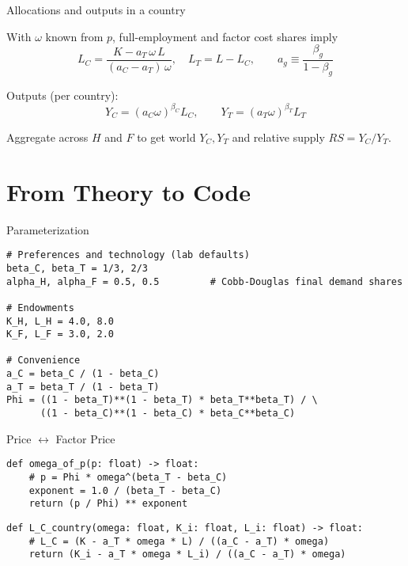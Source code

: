 \documentclass[notes,11pt,aspectratio=169,xcolor=table]{beamer}
\newenvironment{wideitemize}{\itemize\addtolength{\itemsep}{10pt}}{\enditemize}
\begin{document}
\begin{frame}{Allocations and outputs in a country}
\begin{wideitemize}
  \item With \(\omega\) known from \(p\), full-employment and factor cost shares imply
  \[
  L_C = \frac{K - a_T\,\omega\,L}{(a_C-a_T)\,\omega},\quad L_T=L-L_C,\qquad 
  a_g\equiv \frac{\beta_g}{1-\beta_g}
  \]
  \item Outputs (per country):
  \[
   Y_C=(a_C\omega)^{\beta_C} L_C, \qquad Y_T=(a_T\omega)^{\beta_T} L_T
  \]
  \item Aggregate across \(H\) and \(F\) to get world \(Y_C,Y_T\) and relative supply \(RS=Y_C/Y_T\).
\end{wideitemize}
\end{frame}

\section{From Theory to Code}

\begin{frame}[fragile=singleslide]{Parameterization}
\begin{verbatim}
# Preferences and technology (lab defaults)
beta_C, beta_T = 1/3, 2/3
alpha_H, alpha_F = 0.5, 0.5         # Cobb-Douglas final demand shares

# Endowments
K_H, L_H = 4.0, 8.0
K_F, L_F = 3.0, 2.0

# Convenience
a_C = beta_C / (1 - beta_C)
a_T = beta_T / (1 - beta_T)
Phi = ((1 - beta_T)**(1 - beta_T) * beta_T**beta_T) / \
      ((1 - beta_C)**(1 - beta_C) * beta_C**beta_C)
\end{verbatim}
\end{frame}

\begin{frame}[fragile=singleslide]{Price $\leftrightarrow$ Factor Price}
\begin{verbatim}
def omega_of_p(p: float) -> float:
    # p = Phi * omega^(beta_T - beta_C)
    exponent = 1.0 / (beta_T - beta_C)
    return (p / Phi) ** exponent
\end{verbatim}

\begin{verbatim}
def L_C_country(omega: float, K_i: float, L_i: float) -> float:
    # L_C = (K - a_T * omega * L) / ((a_C - a_T) * omega)
    return (K_i - a_T * omega * L_i) / ((a_C - a_T) * omega)
\end{verbatim}
\end{frame}
\end{document}
